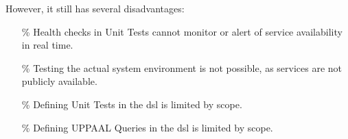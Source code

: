 However, it still has several disadvantages:

\begin{itemize}
    \item [\%] Health checks in Unit Tests cannot monitor or alert of service availability in real time.
    \item [\%] Testing the actual system environment is not possible, as services are not publicly available.
    \item [\%] Defining Unit Tests in the \acrshort{dsl} is limited by scope.
    \item [\%] Defining UPPAAL Queries in the \acrshort{dsl} is limited by scope.
\end{itemize}
